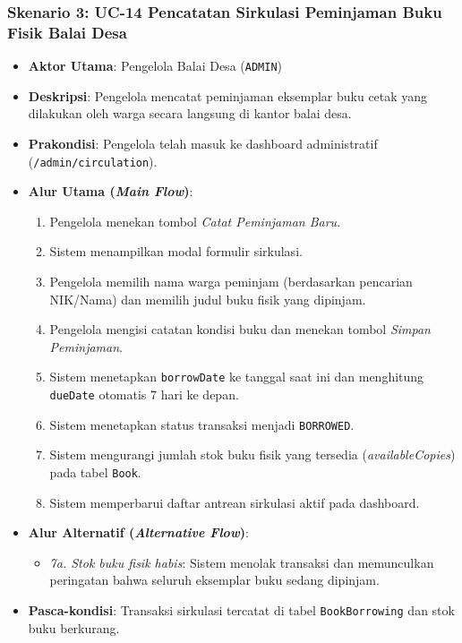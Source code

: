 \documentclass[
  indonesian,
  12pt,
]{report}
\providecommand{\tightlist}{%
  \setlength{\itemsep}{0pt}\setlength{\parskip}{0pt}}
\begin{document}
\subsubsection{Skenario 3: UC-14 Pencatatan Sirkulasi Peminjaman Buku
Fisik Balai
Desa}\label{skenario-3-uc-14-pencatatan-sirkulasi-peminjaman-buku-fisik-balai-desa}

\begin{itemize}
\tightlist
\item
  \textbf{Aktor Utama}: Pengelola Balai Desa (\texttt{ADMIN})
\item
  \textbf{Deskripsi}: Pengelola mencatat peminjaman eksemplar buku cetak
  yang dilakukan oleh warga secara langsung di kantor balai desa.
\item
  \textbf{Prakondisi}: Pengelola telah masuk ke dashboard administratif
  (\texttt{/admin/circulation}).
\item
  \textbf{Alur Utama (\emph{Main Flow})}:

  \begin{enumerate}
  \def\labelenumi{\arabic{enumi}.}
  \tightlist
  \item
    Pengelola menekan tombol \emph{Catat Peminjaman Baru}.
  \item
    Sistem menampilkan modal formulir sirkulasi.
  \item
    Pengelola memilih nama warga peminjam (berdasarkan pencarian
    NIK/Nama) dan memilih judul buku fisik yang dipinjam.
  \item
    Pengelola mengisi catatan kondisi buku dan menekan tombol
    \emph{Simpan Peminjaman}.
  \item
    Sistem menetapkan \texttt{borrowDate} ke tanggal saat ini dan
    menghitung \texttt{dueDate} otomatis 7 hari ke depan.
  \item
    Sistem menetapkan status transaksi menjadi \texttt{BORROWED}.
  \item
    Sistem mengurangi jumlah stok buku fisik yang tersedia
    (\emph{availableCopies}) pada tabel \texttt{Book}.
  \item
    Sistem memperbarui daftar antrean sirkulasi aktif pada dashboard.
  \end{enumerate}
\item
  \textbf{Alur Alternatif (\emph{Alternative Flow})}:

  \begin{itemize}
  \tightlist
  \item
    \emph{7a. Stok buku fisik habis}: Sistem menolak transaksi dan
    memunculkan peringatan bahwa seluruh eksemplar buku sedang dipinjam.
  \end{itemize}
\item
  \textbf{Pasca-kondisi}: Transaksi sirkulasi tercatat di tabel
  \texttt{BookBorrowing} dan stok buku berkurang.
\end{itemize}
\end{document}
